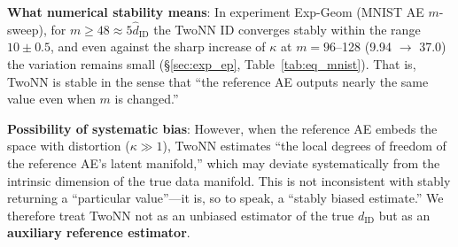 \documentclass[make,article,submit,pdftex,moreauthors]{Definitions/mdpi}
\begin{document}
\textbf{What numerical stability means}:
In experiment Exp-Geom (MNIST AE $m$-sweep), for $m \geq 48 \approx 5\hat{d}_\mathrm{ID}$
the TwoNN ID converges stably within the range $10 \pm 0.5$, and even against the sharp
increase of $\kappa$ at $m = 96$--128 (9.94 $\to$ 37.0) the variation remains small
(\S\ref{sec:exp_ep}, Table~\ref{tab:eq_mnist}).
That is, TwoNN is stable in the sense that ``the reference AE outputs nearly the same
value even when $m$ is changed.''

\textbf{Possibility of systematic bias}:
However, when the reference AE embeds the space with distortion ($\kappa \gg 1$),
TwoNN estimates ``the local degrees of freedom of the reference AE's latent manifold,''
which may deviate systematically from the intrinsic dimension of the true data manifold.
This is not inconsistent with stably returning a ``particular value''---it is, so to
speak, a ``stably biased estimate.''
We therefore treat TwoNN not as an unbiased estimator of the true $d_\mathrm{ID}$ but as
an \textbf{auxiliary reference estimator}.
\end{document}
